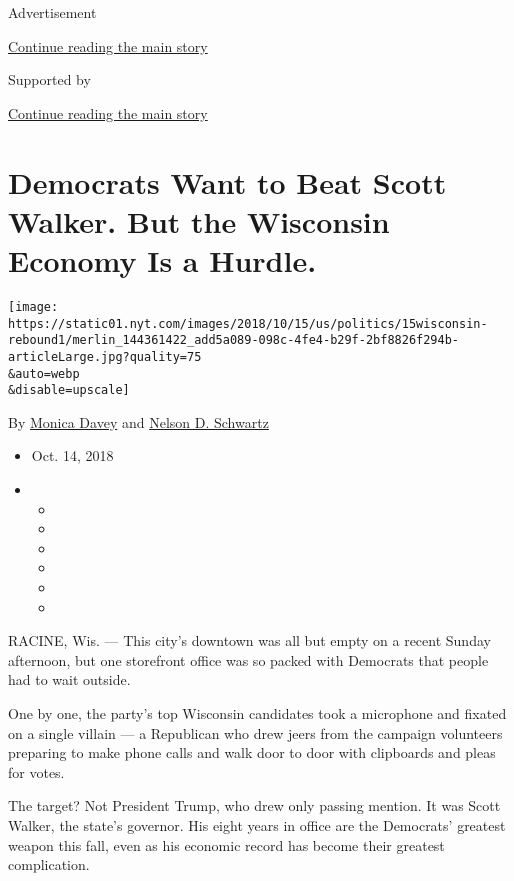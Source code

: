 Advertisement

\protect\hyperlink{after-top}{Continue reading the main story}

Supported by

\protect\hyperlink{after-sponsor}{Continue reading the main story}

\hypertarget{democrats-want-to-beat-scott-walker-but-the-wisconsin-economy-is-a-hurdle}{%
\section{Democrats Want to Beat Scott Walker. But the Wisconsin Economy
Is a
Hurdle.}\label{democrats-want-to-beat-scott-walker-but-the-wisconsin-economy-is-a-hurdle}}

\texttt{[image: https://static01.nyt.com/images/2018/10/15/us/politics/15wisconsin-rebound1/merlin\_144361422\_add5a089-098c-4fe4-b29f-2bf8826f294b-articleLarge.jpg?quality=75\\\&auto=webp\\\&disable=upscale]}

By \href{https://www.nytimes.com/by/monica-davey}{Monica Davey} and
\href{https://www.nytimes.com/by/nelson-d-schwartz}{Nelson D. Schwartz}

\begin{itemize}
\item
  Oct. 14, 2018
\item
  \begin{itemize}
  \item
  \item
  \item
  \item
  \item
  \item
  \end{itemize}
\end{itemize}

RACINE, Wis. --- This city's downtown was all but empty on a recent
Sunday afternoon, but one storefront office was so packed with Democrats
that people had to wait outside.

One by one, the party's top Wisconsin candidates took a microphone and
fixated on a single villain --- a Republican who drew jeers from the
campaign volunteers preparing to make phone calls and walk door to door
with clipboards and pleas for votes.

The target? Not President Trump, who drew only passing mention. It was
Scott Walker, the state's governor. His eight years in office are the
Democrats' greatest weapon this fall, even as his economic record has
become their greatest complication.

